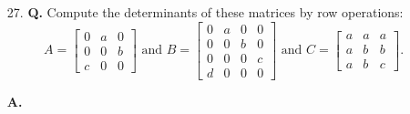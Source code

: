 \documentclass[main.tex]{subfiles}
\begin{document}
\begin{enumerate}
    \item [27.] \textbf{Q.} Compute the determinants of these matrices by row operations:
    $$
    A=\left[\begin{array}{lll}
    0 & a & 0 \\
    0 & 0 & b \\
    c & 0 & 0
    \end{array}\right] \text { and } B=\left[\begin{array}{cccc}
    0 & a & 0 & 0 \\
    0 & 0 & b & 0 \\
    0 & 0 & 0 & c \\
    d & 0 & 0 & 0
    \end{array}\right] \text { and } C=\left[\begin{array}{ccc}
    a & a & a \\
    a & b & b \\
    a & b & c
    \end{array}\right] \text {. }
    $$
    
    \textbf{A.} 
    

\end{enumerate}
\end{document}
